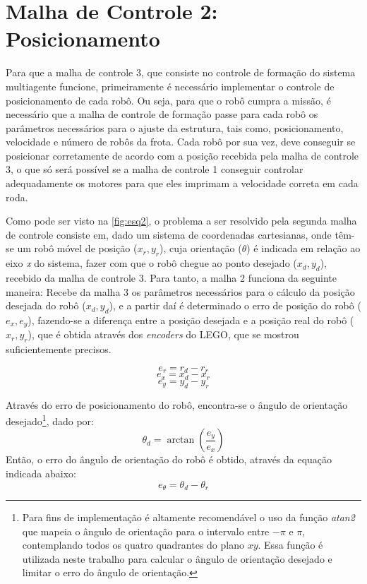 \section{Malha de Controle 2: Posicionamento}
\label{sec:malha2} 
Para que a malha de controle 3, que consiste no controle de formação do sistema multiagente funcione, primeiramente é necessário implementar o controle de posicionamento de cada robô. Ou seja, para que o robô cumpra a missão, é necessário que a malha de controle de formação passe para cada robô os parâmetros necessários para o ajuste da estrutura, tais como, posicionamento, velocidade e número de robôs da frota. Cada robô por sua vez, deve conseguir se posicionar corretamente de acordo com a posição recebida pela malha de controle 3, o que só será possível se a malha de controle 1 conseguir controlar adequadamente os motores para que eles imprimam a velocidade correta em cada roda.

Como pode ser visto na \autoref{fig:esq2}, o problema a ser resolvido pela segunda malha de controle consiste em, dado um sistema de coordenadas cartesianas, onde têm-se um robô móvel de posição (\emph{$x_{r},y_{r}$}), cuja orientação (\emph{$\theta$}) é indicada em relação ao eixo \emph{x} do sistema, %
fazer com que o robô chegue ao ponto desejado (\emph{$x_{d},y_{d}$}), recebido da malha de controle 3. Para tanto, a malha 2 funciona da seguinte maneira: Recebe da malha 3 os parâmetros necessários para o cálculo da posição desejada do robô (\emph{$x_{d},y_{d}$}), e a partir daí é determinado o erro de posição do robô (\emph{$e_{x},e_{y}$}), fazendo-se a diferença entre a posição desejada e a posição real do robô (\emph{$x_{r},y_{r}$}), que é obtida através dos \emph{encoders} do LEGO\textregistered, que se mostrou suficientemente precisos.

\begin{equation}
e_{r} = r_{d} - r_{r}
\label{eq:errr}
\end{equation}
\begin{equation}
e_{x} = x_{d} - x_{r}
\label{eq:errx}
\end{equation}
\begin{equation}
e_{y} = y_{d} - y_{r}
\label{eq:erry}
\end{equation}

Através do erro de posicionamento do robô, encontra-se o ângulo de orientação desejado\footnote{Para fins de implementação é altamente recomendável o uso da função \emph{atan2} que mapeia o ângulo de orientação para o intervalo entre $-\pi$ e $\pi$, contemplando todos os quatro quadrantes do plano $xy$. Essa função é utilizada neste trabalho para calcular o ângulo de orientação desejado e limitar o erro do ângulo de orientação.}, dado por: %
\begin{equation}
\theta_{d} = \arctan\left(\dfrac{e_{y}}{e_{x}}\right)
\label{eq:thetad}
\end{equation}
Então, o erro do ângulo de orientação do robô é obtido, através da %
equação indicada abaixo: 
\begin{equation}
e_{\theta} = \theta_{d} - \theta_{r}
\label{eq:errtheta}
\end{equation}


